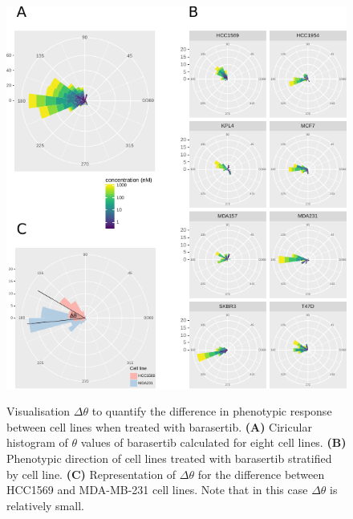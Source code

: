 \documentclass[a4paper,11pt,twoside,openright]{scrbook}
\begin{document}
\begin{figure}
    \captionsetup{width=0.8\textwidth}
    \caption[Visualisation of $\Delta\theta$ to quantify the difference in phenotypic direction between cell lines]{
Visualisation $\Delta\theta$ to quantify the difference in phenotypic response between cell lines when treated with barasertib.
\textbf{(A)} Ciricular histogram of $\theta$ values of barasertib calculated for eight cell lines.
\textbf{(B)} Phenotypic direction of cell lines treated with barasertib stratified by cell line.
\textbf{(C)} Representation of $\Delta\theta$ for the difference between HCC1569 and MDA-MB-231 cell lines. Note that in this case $\Delta\theta$ is relatively small.
}
    \includegraphics[scale=1.15]{figs/ch3tccsCellLines}
    \label{figure:theta_cell_lines}
\end{figure}
\end{document}
